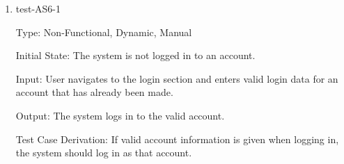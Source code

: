 \documentclass[12pt, titlepage]{article}
\begin{document}
\begin{enumerate}











  \item{test-AS6-1\\}
  
  Type: Non-Functional, Dynamic, Manual

  Initial State: The system is not logged in to an account.

  Input: User navigates to the login section and enters valid login data for
  an account that has already been made.

  Output: The system logs in to the valid account.

  Test Case Derivation: If valid account information is given when logging in,
  the system should log in as that account.


\end{enumerate}
\end{document}
